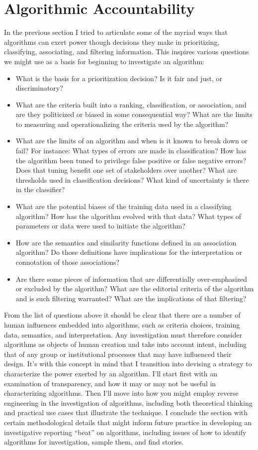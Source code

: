 \chapter{Algorithmic Accountability }
In the previous section I tried to articulate some of the myriad ways that algorithms can exert power though decisions they make in prioritizing, classifying, associating, and filtering information. This inspires various questions we might use as a basis for beginning to investigate an algorithm: 
\begin{itemize}
\item What is the basis for a prioritization decision? Is it fair and just, or discriminatory? 
\item What are the criteria built into a ranking, classification, or association, and are they politicized or biased in some consequential way? What are the limits to measuring and operationalizing the criteria used by the algorithm? 
\item What are the limits of an algorithm and when is it known to break down or fail? For instance: What types of errors are made in classification? How has the algorithm been tuned to privilege false positive or false negative errors? Does that tuning benefit one set of stakeholders over another? What are thresholds used in classification decisions? What kind of uncertainty is there in the classifier?
\item What are the potential biases of the training data used in a classifying algorithm? How has the algorithm evolved with that data? What types of parameters or data were used to initiate the algorithm? 
\item How are the semantics and similarity functions defined in an association algorithm? Do those definitions have implications for the interpretation or connotation of those associations? 
\item Are there some pieces of information that are differentially over-emphasized or excluded by the algorithm? What are the editorial criteria of the algorithm and is such filtering warranted? What are the implications of that filtering? 
\end{itemize}

From the list of questions above it should be clear that there are a number of human influences embedded into algorithms, such as criteria choices, training data, semantics, and interpretation. Any investigation must therefore consider algorithms as objects of human creation and take into account intent, including that of any group or institutional processes that may have influenced their design. 
It's with this concept in mind that I transition into devising a strategy to characterize the power exerted by an algorithm. I'll start first with an examination of transparency, and how it may or may not be useful in characterizing algorithms. Then I'll move into how you might employ reverse engineering in the investigation of algorithms, including both theoretical thinking and practical use cases that illustrate the technique. I conclude the section with certain methodological details that might inform future practice in developing an investigative reporting ``beat'' on algorithms, including issues of how to identify algorithms for investigation, sample them, and find stories.
